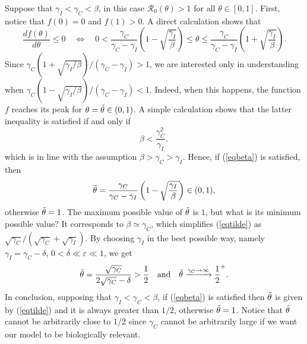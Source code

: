 \documentclass[11pt,reqno]{amsart}
\theoremstyle{boldremark}
\begin{document}
Suppose that $\gamma_I < \gamma_C < \beta$, in this case $\mathcal{R}_0 (\theta) > 1$ for all $\theta \in [0,1]$. First, notice that $f(0)=0$ and $f(1)>0$. A direct calculation shows that 
\begin{equation*} 
    \frac{df(\theta)}{d\theta} \le 0 \quad \Longleftrightarrow \quad 0 < \frac{\gamma_C}{\gamma_C - \gamma_I} \left(1 - \sqrt{\frac{\gamma_I}{\beta}}\right) \le \theta \le \frac{\gamma_C}{\gamma_C - \gamma_I} \left(1 + \sqrt{\frac{\gamma_I}{\beta}}\right). 
\end{equation*}
Since $\gamma_C \left(1 + \sqrt{\gamma_I/\beta}\right)/(\gamma_C - \gamma_I) > 1$, we are interested only in understanding when \linebreak $\gamma_C \left(1 - \sqrt{\gamma_I/\beta}\right)/(\gamma_C - \gamma_I) < 1$. Indeed, when this happens, the function $f$ reaches its peak for $\theta=\Tilde{\theta} \in (0,1)$. A simple calculation shows that the latter inequality is satisfied if and only if 
\begin{equation} \label{eqbeta}
    \beta < \frac{\gamma_C^2}{\gamma_I}, 
\end{equation}
which is in line with the assumption $\beta>\gamma_C>\gamma_I$. Hence, if (\ref{eqbeta}) is satisfied, then 
\begin{equation} \label{eqtilde}
    \Tilde{\theta} = \frac{\gamma_C}{\gamma_C - \gamma_I} \left(1 - \sqrt{\frac{\gamma_I}{\beta}}\right) \in (0,1), 
\end{equation}
otherwise $\Tilde{\theta}=1$. The maximum possible value of $\Tilde{\theta}$ is $1$, but what is its minimum possible value? It corresponds to $\beta \simeq \gamma_C$, which simplifies (\ref{eqtilde}) as $\sqrt{\gamma_C} / (\sqrt{\gamma_C} + \sqrt{\gamma_I})$. By choosing $\gamma_I$ in the best possible way, namely $\gamma_I = \gamma_C - \delta$, $0<\delta \ll \varepsilon \ll 1$, we get 
\begin{equation*}
    \Tilde{\theta} = \frac{\sqrt{\gamma_C}}{2\sqrt{\gamma_C}-\delta} > \frac{1}{2} \quad \textnormal{and} \quad \Tilde{\theta} \xrightarrow{\gamma_C \to \infty} {\frac{1}{2}}^+. 
\end{equation*}
In conclusion, supposing that $\gamma_I < \gamma_C < \beta$, if (\ref{eqbeta}) is satisfied then $\Tilde{\theta}$ is given by (\ref{eqtilde}) and it is always greater than $1/2$, otherwise $\Tilde{\theta}=1$. Notice that $\Tilde{\theta}$ cannot be arbitrarily close to $1/2$ since $\gamma_C$ cannot be arbitrarily large if we want our model to be biologically relevant. 
\end{document}
